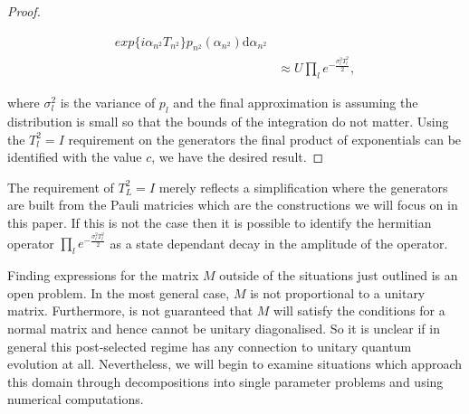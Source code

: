 \documentclass[aps,pra,twocolumn,superscriptaddress,numerical,floatfix]{revtex4-1}
\begin{document}
\begin{proof}
\begin{widetext}
\begin{align}
	exp\{i \alpha_{n^2} T_{n^2}\}p_{n^2}(\alpha_{n^2}) \mathrm{d}\alpha_{n^2} \\
	&\approx U \prod_l e^{-\frac{\sigma_l^2 T_l^2}{2}},\label{eq:approx commuting, general case}
\end{align}
\end{widetext}
where $\sigma_l^2$ is the variance of $p_l$ and the final approximation is assuming the distribution is small so that the bounds of the integration do not matter.  Using the $T_l^2=I$ requirement on the generators the final product of exponentials can be identified with the value $c$, we have the desired result.
\end{proof}
The requirement of $T_L^2=I$ merely reflects a simplification where the generators are built from the Pauli matricies which are the constructions we will focus on in this paper.  If this is not the case then it is possible to identify the hermitian operator $\prod_l e^{-\frac{\sigma_l^2 T_l^2}{2}}$ as a state dependant decay in the amplitude of the operator.




Finding expressions for the matrix $M$ outside of the situations just outlined is an open problem.  In the most general case, $M$ is not proportional to a unitary matrix.  Furthermore, is not guaranteed that $M$ will satisfy the conditions for a normal matrix and hence cannot be unitary diagonalised.  So it is unclear if in general this post-selected regime has any connection to unitary quantum evolution at all.  Nevertheless, we will begin to examine situations which approach this domain through decompositions into single parameter problems and using numerical computations.
\end{document}
